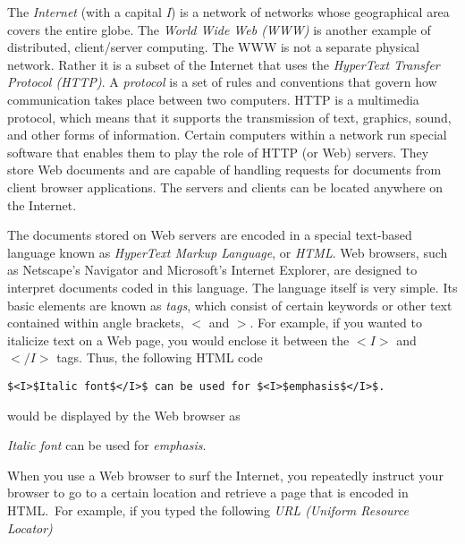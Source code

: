 \splarge The {\it Internet} (with a capital {\it I}) 
is a network of networks whose geographical area covers the entire
globe.  The {\it World Wide Web
(WWW)} is another example of distributed, client/server
computing.  The WWW is not a separate physical network.  Rather it is
a subset of the Internet that uses the {\it HyperText Transfer
Protocol (HTTP)}. A {\it protocol} is a
set of rules and conventions that govern how communication takes place
between two computers.  HTTP is a multimedia protocol, which means
that it supports the transmission of text, graphics, sound, and other
forms of information.  Certain computers within a network run special
software that enables them to play the role of HTTP (or Web) servers.
They store Web documents and are capable of handling requests for
documents from client browser applications.  The servers and clients
can be located anywhere on the Internet.\spnormallar

The documents stored on Web servers are encoded in a special
text-based language known as {\it HyperText Markup Language}, or {\it
HTML}. Web browsers, such as Netscape's Navigator and
Microsoft's Internet Explorer, are designed to interpret documents
coded in this language.  The language itself is very simple.  Its basic
elements are known as {\it tags}, which consist of certain keywords or
other text contained within angle brackets, $<$ and $>$. For example,
if you wanted to italicize text on a Web page, you would
enclose it between the $<I>$ and $</I>$ tags.  Thus, the following HTML
code

\begin{jjjlisting}
\begin{lstlisting}
$<I>$Italic font$</I>$ can be used for $<I>$emphasis$</I>$.
\end{lstlisting}
\end{jjjlisting}

\noindent would be displayed by the Web browser as

\begin{extract}
{\it Italic font} can be used for {\it emphasis}.
\end{extract}

\noindent When you use a Web browser to surf the Internet, you repeatedly
instruct your browser to go to a certain location and retrieve
a page that is encoded in HTML.~For example, if you typed the
following {\it URL (Uniform Resource Locator)}

